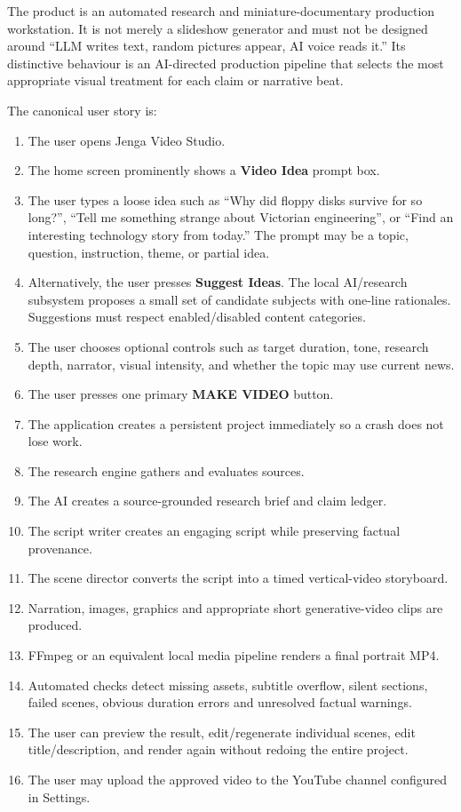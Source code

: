 \documentclass[10pt,journal,compsoc]{IEEEtran}
\begin{document}
The product is an automated research and miniature-documentary production workstation. It is not merely a slideshow generator and must not be designed around ``LLM writes text, random pictures appear, AI voice reads it.'' Its distinctive behaviour is an AI-directed production pipeline that selects the most appropriate visual treatment for each claim or narrative beat.

The canonical user story is:

\begin{enumerate}
    \item The user opens Jenga Video Studio.
    \item The home screen prominently shows a \textbf{Video Idea} prompt box.
    \item The user types a loose idea such as ``Why did floppy disks survive for so long?'', ``Tell me something strange about Victorian engineering'', or ``Find an interesting technology story from today.'' The prompt may be a topic, question, instruction, theme, or partial idea.
    \item Alternatively, the user presses \textbf{Suggest Ideas}. The local AI/research subsystem proposes a small set of candidate subjects with one-line rationales. Suggestions must respect enabled/disabled content categories.
    \item The user chooses optional controls such as target duration, tone, research depth, narrator, visual intensity, and whether the topic may use current news.
    \item The user presses one primary \textbf{MAKE VIDEO} button.
    \item The application creates a persistent project immediately so a crash does not lose work.
    \item The research engine gathers and evaluates sources.
    \item The AI creates a source-grounded research brief and claim ledger.
    \item The script writer creates an engaging script while preserving factual provenance.
    \item The scene director converts the script into a timed vertical-video storyboard.
    \item Narration, images, graphics and appropriate short generative-video clips are produced.
    \item FFmpeg or an equivalent local media pipeline renders a final portrait MP4.
    \item Automated checks detect missing assets, subtitle overflow, silent sections, failed scenes, obvious duration errors and unresolved factual warnings.
    \item The user can preview the result, edit/regenerate individual scenes, edit title/description, and render again without redoing the entire project.
    \item The user may upload the approved video to the YouTube channel configured in Settings.
\end{enumerate}
\end{document}

